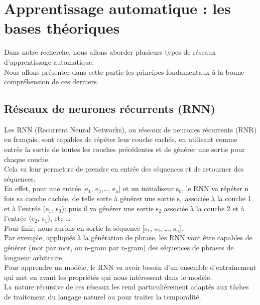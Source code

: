 \documentclass[11pt]{article}
\begin{document}
\newpage
\section{Apprentissage automatique : les bases théoriques}
\label{sec:org59606d4}
Dans notre recherche, nous allons aborder plusieurs types de réseaux d'apprentissage automatique.\\
Nous allons présenter dans cette partie les principes fondamentaux à la bonne compréhension de ces derniers.\\

\subsection{Réseaux de neurones récurrents (RNN)}
\label{sec:orgbc53f65}
Les RNN (Recurrent Neural Networks), ou réseaux de neurones récurrents (RNR) en français, sont capables de répéter leur couche cachée, en utilisant comme entrée la sortie de toutes les couches précédentes et de générer une sortie pour chaque couche.\\
Cela va leur permettre de prendre en entrée des séquences et de retourner des séquences.\\
En effet, pour une entrée [e\(_{\text{1}}\), e\(_{\text{2}}\),\ldots{}, e\(_{\text{n}}\)] et un initialiseur s\(_{\text{0}}\), le RNN va répéter n fois sa couche cachée, de telle sorte à générer une sortie s\(_{\text{1}}\) associée à la couche 1 et à l'entrée (e\(_{\text{1}}\), s\(_{\text{0}}\)); puis il va générer une sortie s\(_{\text{2}}\) associée à la couche 2 et à l'entrée (e\(_{\text{2}}\), s\(_{\text{1}}\)), etc \ldots{}\\
Pour finir, nous aurons en sortie la séquence [s\(_{\text{1}}\), s\(_{\text{2}}\), \ldots{}, s\(_{\text{n}}\)].\\

Par exemple, appliqués à la génération de phrase, les RNN vont être capables de générer (mot par mot, ou n-gram par n-gram) des séquences de phrases de longueur arbitraire.\\

Pour apprendre un modèle, le RNN va avoir besoin d'un ensemble d'entraînement qui met en avant les propriétés qui nous intéressent dans le modèle.\\

La nature récursive de ces réseaux les rend particulièrement adaptés aux tâches de traitement du langage naturel ou pour traiter la temporalité.\\
\end{document}
